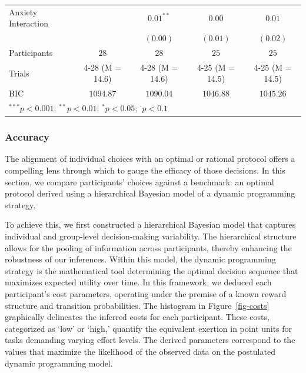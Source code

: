 \documentclass[
]{article}
\begin{document}
\begin{table}
\begin{minipage}[t]{\linewidth}
{\begin{center}
\begin{tabular}{l c c c c}
Anxiety Interaction &                 & $0.01^{**}$     & $0.00$          & $0.01$          \\
                    &                 & $(0.00)$        & $(0.01)$        & $(0.02)$        \\
\hline
Participants        & $28$            & $28$            & $25$            & $25$            \\
Trials              & 4-28 (M = 14.6) & 4-28 (M = 14.6) & 4-25 (M = 14.5) & 4-25 (M = 14.5) \\
BIC                 & $1094.87$       & $1090.04$       & $1046.88$       & $1045.26$       \\
\hline
\multicolumn{5}{l}{\scriptsize{$^{***}p<0.001$; $^{**}p<0.01$; $^{*}p<0.05$; $^{\cdot}p<0.1$}}
\end{tabular}

\label{table:coefficients}
\end{center}

}

\end{minipage}%

\end{table}

\begin{table}

\end{table}

\hypertarget{sec-pilotaccuracy}{%
\subsubsection{Accuracy}\label{sec-pilotaccuracy}}

The alignment of individual choices with an optimal or rational protocol
offers a compelling lens through which to gauge the efficacy of those
decisions. In this section, we compare participants' choices against a
benchmark: an optimal protocol derived using a hierarchical Bayesian
model of a dynamic programming strategy.

To achieve this, we first constructed a hierarchical Bayesian model that
captures individual and group-level decision-making variability. The
hierarchical structure allows for the pooling of information across
participants, thereby enhancing the robustness of our inferences. Within
this model, the dynamic programming strategy is the mathematical tool
determining the optimal decision sequence that maximizes expected
utility over time. In this framework, we deduced each participant's cost
parameters, operating under the premise of a known reward structure and
transition probabilities. The histogram in Figure~\ref{fig-costs}
graphically delineates the inferred costs for each participant. These
costs, categorized as `low' or `high,' quantify the equivalent exertion
in point units for tasks demanding varying effort levels. The derived
parameters correspond to the values that maximize the likelihood of the
observed data on the postulated dynamic programming model.
\end{document}
